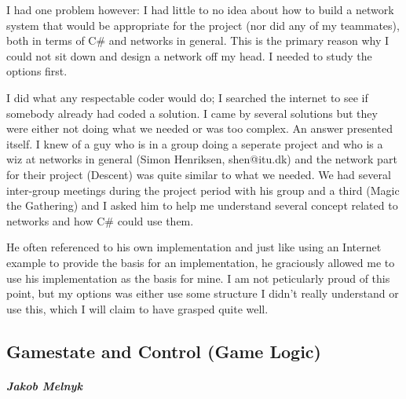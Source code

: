 I had one problem however: I had little to no idea about how to build a network system that would be appropriate for the project (nor did any of my teammates), both in terms of C# and networks in general. 
This is the primary reason why I could not sit down and design a network off my head. I needed to study the options first.

I did what any respectable coder would do; I searched the internet to see if somebody already had coded a solution. 
I came by several solutions but they were either not doing what we needed or was too complex.
An answer presented itself. I knew of a guy who is in a group doing a seperate project and who is a wiz at networks in general (Simon Henriksen, shen@itu.dk) and the network part for their project (Descent) was quite similar to what we needed. 
We had several inter-group meetings during the project period with his group and a third (Magic the Gathering) and I asked him to help me understand several concept related to networks and how C# could use them.

He often referenced to his own implementation and just like using an Internet example to provide the basis for an implementation, he graciously allowed me to use his implementation as the basis for mine.
I am not peticularly proud of this point, but my options was either use some structure I didn't really understand or use this, which I will claim to have grasped quite well.

\subsection{Gamestate and Control (Game Logic)}
\subparagraph{Jakob Melnyk}
